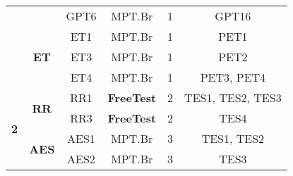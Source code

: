 \begin{table}[H]
{\begin{tabular}{|c|c|c|c|c|c|}
                                                                                &                               & GPT6        & MPT.Br            & 1                                                                                  & GPT16                                                                     \\ \cline{2-6} 
                                                                                & \multirow{3}{*}{\textbf{ET}}  & ET1         & MPT.Br            & 1                                                                                  & PET1                                                                      \\ \cline{3-6} 
                                                                                &                               & ET3         & MPT.Br            & 1                                                                                  & PET2                                                                      \\ \cline{3-6} 
                                                                                &                               & ET4         & MPT.Br            & 1                                                                                  & PET3, PET4                                                                \\ \hline
\multirow{5}{*}{\textbf{2}}                                                     & \multirow{2}{*}{\textbf{RR}}  & RR1         & \textbf{FreeTest} & 2                                                                                  & TES1, TES2, TES3                                                          \\ \cline{3-6} 
                                                                                &                               & RR3         & \textbf{FreeTest} & 2                                                                                  & TES4                                                                      \\ \cline{2-6} 
                                                                                & \multirow{3}{*}{\textbf{AES}} & AES1        & MPT.Br            & 3                                                                                  & TES1, TES2                                                                \\ \cline{3-6} 
                                                                                &                               & AES2        & MPT.Br            & 3                                                                                  & TES3                                                                      \\ \cline{3-6} 

\end{tabular}}
\end{table}
